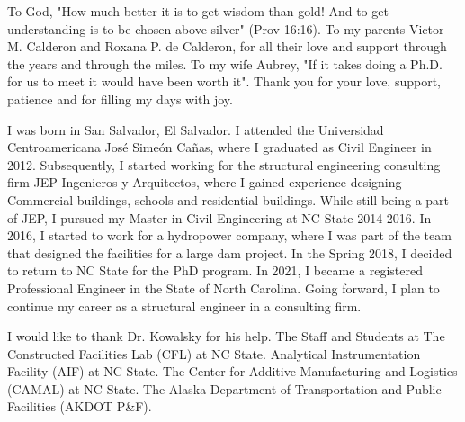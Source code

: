\maketitlepage

\begin{dedication}
\centering
To God, "How much better it is to get wisdom than gold! And to get understanding is to be chosen above silver" (Prov 16:16). 
 \newline To my parents Victor M. Calderon and Roxana P. de Calderon, for all their love and support through the years and through the miles. 
 \newline To my wife Aubrey, "If it takes doing a Ph.D. for us to meet it would have been worth it". Thank you for your love, support, patience and for filling my days with joy.
\end{dedication}
%
\begin{biography}
I was born in San Salvador, El Salvador. I attended the Universidad Centroamericana José Simeón Cañas, where I graduated as Civil Engineer in 2012. Subsequently, I started working for the structural engineering consulting firm JEP Ingenieros y Arquitectos, where I gained experience designing Commercial buildings, schools and residential buildings. While still being a part of JEP, I pursued my Master in Civil Engineering at NC State 2014-2016. In 2016, I started to work for a hydropower company, where I was part of the team that designed the facilities for a large dam project. In the Spring 2018, I decided to return to NC State for the PhD program. In 2021, I became a registered Professional Engineer in the State of North Carolina. Going forward, I plan to continue my career as a structural engineer in a consulting firm.
\end{biography}
%
\begin{acknowledgements}
I would like to thank Dr. Kowalsky for his help. The Staff and Students at The Constructed Facilities Lab (CFL) at NC State. Analytical Instrumentation Facility (AIF) at NC State. The Center for Additive Manufacturing and Logistics (CAMAL) at NC State. The Alaska Department of Transportation and Public Facilities (AKDOT P\&F).
\end{acknowledgements}


\thesistableofcontents

\thesislistoftables

\thesislistoffigures
